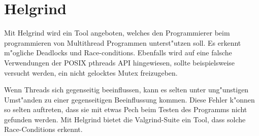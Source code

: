 \section{Helgrind}
Mit Helgrind wird ein Tool angeboten, welches den Programmierer beim programmieren von Multithread Programmen unterst"utzen soll. Es erkennt m"ogliche Deadlocks und Race-conditions. Ebenfalls wird auf eine falsche Verwendungen der POSIX pthreads API hingewiesen, sollte beispielsweise versucht werden, ein nicht gelocktes Mutex freizugeben.

Wenn Threads sich gegenseitig beeinflussen, kann es selten unter ung"unstigen Umst"anden zu einer gegenseitigen Beeinflussung kommen. Diese Fehler k"onnen so selten auftreten, dass sie mit etwas Pech beim Testen des Programms nicht gefunden werden. Mit Helgrind bietet die Valgrind-Suite ein Tool, dass solche Race-Conditions erkennt.

